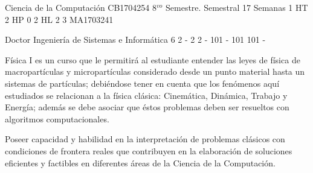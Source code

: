 \documentclass[a4paper,8pt]{article}
\begin{document}
\setNombreProfesor{}
\setGradoProfesorAbreviado{}
\sylabusHeader

\academicaTable
{Ciencia de la Computación} %
{CB1704254} %
{8$^{vo}$ Semestre.} %
{Semestral} %
{17 Semanas} %
{1 HT} %
{2 HP} %
{0} %
{2 HL}  %
{2} %
{3} %
{MA1703241} %

\administrativaTable
{Doctor} %
{Ingeniería de Sistemas e Informática} %
{6} %
{2} %
{-} %
{2} %
{2} %
{-} %
{101} %
{-} %
{101} %
{101} %
{-} %


\begin{fundamentacion}
Física I es un curso que le permitirá al estudiante entender
las leyes de física de macropartículas y micropartículas considerado desde un
punto material hasta un sistemas de partículas; debiéndose tener en cuenta que los
fenómenos aquí estudiados se relacionan a la física clásica: Cinemática, Dinámica, Trabajo y Energía; 
además se debe asociar que éstos problemas deben ser resueltos con algoritmos computacionales.

Poseer capacidad y habilidad en la interpretación de problemas clásicos
con condiciones de frontera reales que contribuyen en la elaboración de soluciones eficientes
y factibles en diferentes áreas de la Ciencia de la Computación.

\end{fundamentacion}

\begin{sumilla}
\item 
\item 
\item 
\item 
\item 
\item 

\end{sumilla}

\begin{competenciasAsignatura}
\item {}
\item {}
\item {}

\end{competenciasAsignatura}
\end{document}
